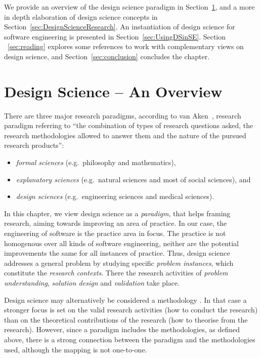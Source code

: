 \documentclass[graybox]{svmult}
\begin{document}
We provide an overview of the design science paradigm in Section~\ref{sec:overview}, and a more in depth elaboration of design science concepts in Section~\ref{sec:DesignScienceResearch}. An instantiation of design science for software engineering is presented in Section~\ref{sec:UsingDSinSE}. Section ~\ref{sec:reading} explores some references to work with complementary views on design science, and Section~\ref{sec:conclusion} concludes the chapter.


\section{Design Science -- An Overview}
\label{sec:overview}


There are three major research paradigms, according to van Aken~\cite{van_aken_management_2004}, research paradigm referring to ``the combination of types of research questions asked, the research methodologies allowed to answer them and the nature of the pursued research products'':
\begin{itemize}
\item \emph{formal sciences} (e.g.\ philosophy and mathematics), 
\item \emph{explanatory sciences} (e.g.\ natural sciences and most of social sciences), and 
\item \emph{design sciences} (e.g.\ engineering sciences and medical sciences).  
\end{itemize}

In this chapter, we view design science as a \emph{paradigm}, that helps framing research, aiming towards improving an area of practice. In our case, the engineering of software is the practice area in focus. The practice is not homogenous over all kinds of software engineering, neither are the potential improvements the same for all instances of practice. Thus, design science addresses a general problem by studying  specific \emph{problem instances}, which constitute the \emph{research contexts}.  There the research activities of \emph{problem understanding}, \emph{solution design} and \emph{validation} take place.

Design science may alternatively be considered a methodology \cite{Wohlin2015}. In that case a stronger focus is set on the valid research activities (how to conduct the research) than on the theoretical contributions of the research (how to theorise from the research). However, since a paradigm includes the methodologies, as defined above, there is a strong connection between the paradigm and the methodologies used, although the mapping is not one-to-one.
\end{document}
